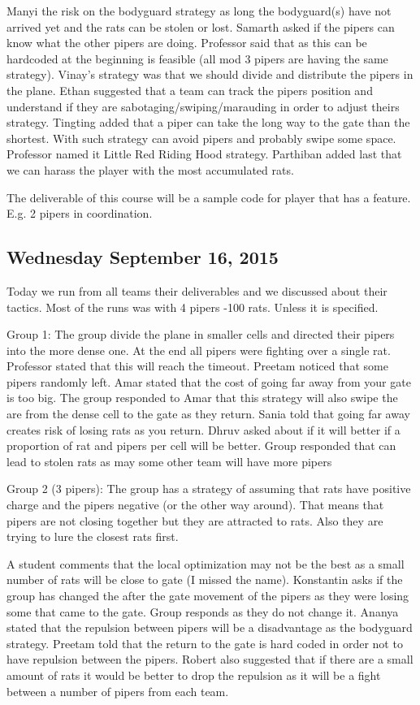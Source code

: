 Manyi the risk on the bodyguard strategy as long the bodyguard(s) have not arrived yet and the rats can be stolen or lost. 
Samarth asked if the pipers can know what the other pipers are doing. Professor said that as this can be hardcoded at the beginning is feasible (all mod 3 pipers are having the same strategy). 
Vinay’s strategy was that we should divide and distribute the pipers in the plane.
Ethan suggested that a team can track the pipers position and understand if they are sabotaging/swiping/marauding in order to adjust theirs strategy.
Tingting added that a piper can take the long way to the gate than the shortest. With such strategy can avoid pipers and probably swipe some space. Professor named it Little Red Riding Hood strategy.
Parthiban added last that we can harass the player with the most accumulated rats.

The deliverable of this course will be a sample code for player that has a feature.
E.g. 2 pipers in coordination.

\subsection{Wednesday September 16, 2015}
Today we run from all teams their deliverables and we discussed about their tactics.
Most of the runs was with 4 pipers -100 rats. Unless it is specified.

Group 1: 
The group divide the plane in smaller cells and directed their pipers into the more dense one.
At the end all pipers were fighting over a single rat.
Professor stated that this will reach the timeout. 
Preetam noticed that some pipers randomly left.
Amar stated that the cost of going far away from your gate is too big.
The group responded to Amar that this strategy will also swipe the are from the dense cell to the gate as they return.
Sania told that going far away creates risk of losing rats as you return.
Dhruv asked about if it will better if a proportion of rat and pipers per cell will be better.
Group responded that can lead to stolen rats as may some other team will have more pipers


Group 2 (3 pipers):
The group has a strategy of assuming that rats have positive charge and the pipers negative (or the other way around). That means that pipers are not closing together but they are attracted to rats. Also they are trying to lure the closest rats first. 

A student comments that the local optimization may not be the best as a small number of rats will be close to gate (I missed the name).
Konstantin asks if the group has changed the after the gate movement of the pipers as they were losing some that came to the gate.
Group responds as they do not change it.
Ananya stated that the repulsion between pipers will be a disadvantage as the bodyguard strategy.
Preetam told that the return to the gate is hard coded in order not to have repulsion between the pipers.
Robert also suggested that if there are a small amount of rats it would be better to drop the repulsion as it will be a fight between a number of pipers from each team.


